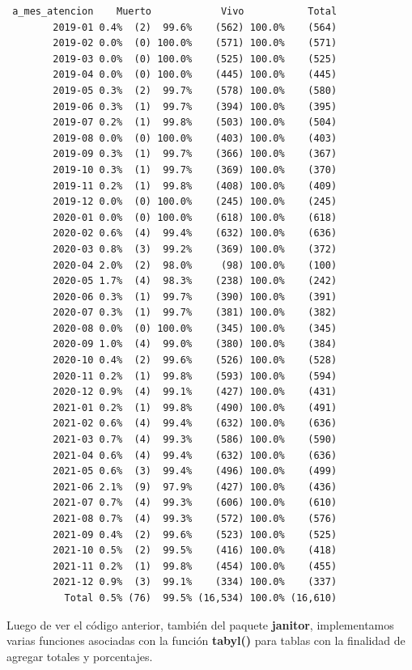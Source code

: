 \documentclass[
  letterpaper,
  DIV=11,
  numbers=noendperiod]{scrreprt}
\begin{document}
\begin{verbatim}
 a_mes_atencion    Muerto            Vivo           Total
        2019-01 0.4%  (2)  99.6%    (562) 100.0%    (564)
        2019-02 0.0%  (0) 100.0%    (571) 100.0%    (571)
        2019-03 0.0%  (0) 100.0%    (525) 100.0%    (525)
        2019-04 0.0%  (0) 100.0%    (445) 100.0%    (445)
        2019-05 0.3%  (2)  99.7%    (578) 100.0%    (580)
        2019-06 0.3%  (1)  99.7%    (394) 100.0%    (395)
        2019-07 0.2%  (1)  99.8%    (503) 100.0%    (504)
        2019-08 0.0%  (0) 100.0%    (403) 100.0%    (403)
        2019-09 0.3%  (1)  99.7%    (366) 100.0%    (367)
        2019-10 0.3%  (1)  99.7%    (369) 100.0%    (370)
        2019-11 0.2%  (1)  99.8%    (408) 100.0%    (409)
        2019-12 0.0%  (0) 100.0%    (245) 100.0%    (245)
        2020-01 0.0%  (0) 100.0%    (618) 100.0%    (618)
        2020-02 0.6%  (4)  99.4%    (632) 100.0%    (636)
        2020-03 0.8%  (3)  99.2%    (369) 100.0%    (372)
        2020-04 2.0%  (2)  98.0%     (98) 100.0%    (100)
        2020-05 1.7%  (4)  98.3%    (238) 100.0%    (242)
        2020-06 0.3%  (1)  99.7%    (390) 100.0%    (391)
        2020-07 0.3%  (1)  99.7%    (381) 100.0%    (382)
        2020-08 0.0%  (0) 100.0%    (345) 100.0%    (345)
        2020-09 1.0%  (4)  99.0%    (380) 100.0%    (384)
        2020-10 0.4%  (2)  99.6%    (526) 100.0%    (528)
        2020-11 0.2%  (1)  99.8%    (593) 100.0%    (594)
        2020-12 0.9%  (4)  99.1%    (427) 100.0%    (431)
        2021-01 0.2%  (1)  99.8%    (490) 100.0%    (491)
        2021-02 0.6%  (4)  99.4%    (632) 100.0%    (636)
        2021-03 0.7%  (4)  99.3%    (586) 100.0%    (590)
        2021-04 0.6%  (4)  99.4%    (632) 100.0%    (636)
        2021-05 0.6%  (3)  99.4%    (496) 100.0%    (499)
        2021-06 2.1%  (9)  97.9%    (427) 100.0%    (436)
        2021-07 0.7%  (4)  99.3%    (606) 100.0%    (610)
        2021-08 0.7%  (4)  99.3%    (572) 100.0%    (576)
        2021-09 0.4%  (2)  99.6%    (523) 100.0%    (525)
        2021-10 0.5%  (2)  99.5%    (416) 100.0%    (418)
        2021-11 0.2%  (1)  99.8%    (454) 100.0%    (455)
        2021-12 0.9%  (3)  99.1%    (334) 100.0%    (337)
          Total 0.5% (76)  99.5% (16,534) 100.0% (16,610)
\end{verbatim}

Luego de ver el código anterior, también del paquete \textbf{janitor},
implementamos varias funciones asociadas con la función \textbf{tabyl()}
para tablas con la finalidad de agregar totales y porcentajes.
\end{document}
